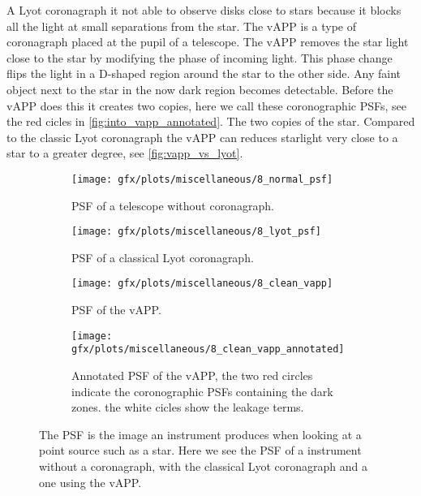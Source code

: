 A Lyot coronagraph it not able to observe disks close to stars because it blocks all the light at small separations from the star. The \ac{vAPP} \cite{vapp_snik} is a type of coronagraph placed at the pupil of a telescope. The \ac{vAPP} removes the star light close to the star by modifying the phase of incoming light. This phase change flips the light in a D-shaped region around the star to the other side. Any faint object next to the star in the now dark region becomes detectable. Before the \ac{vAPP} does this it creates two copies, here we call these coronographic \acp{PSF}, see the red cicles in \autoref{fig:into_vapp_annotated}. The two copies of the star. Compared to the classic Lyot coronagraph the \ac{vAPP} can reduces starlight very close to a star to a greater degree, see \autoref{fig:vapp_vs_lyot}.  

\begin{figure}[h!]
      \begin{subfigure}[t]{0.5\textwidth}
        \texttt{[image: gfx/plots/miscellaneous/8\_normal\_psf]}
        \caption{\ac{PSF} of a telescope without coronagraph.}
        \label{fig:classic_psf}
      \end{subfigure}
      \begin{subfigure}[t]{0.5 \textwidth}
        \texttt{[image: gfx/plots/miscellaneous/8\_lyot\_psf]}
        \caption{\ac{PSF} of a classical Lyot coronagraph.}
        \label{fig:lyot}
      \end{subfigure}%
      
      \begin{subfigure}[t]{0.5\textwidth}
        \texttt{[image: gfx/plots/miscellaneous/8\_clean\_vapp]}
        \caption{\ac{PSF} of the \ac{vAPP}.}
        \label{fig:into_vapp}
      \end{subfigure}
      \begin{subfigure}[t]{0.5\textwidth}
        \texttt{[image: gfx/plots/miscellaneous/8\_clean\_vapp\_annotated]}
        \caption{Annotated \ac{PSF} of the \ac{vAPP}, the two red circles indicate the coronographic \acp{PSF} containing the dark zones. the white cicles show the leakage terms.}
        \label{fig:into_vapp_annotated}
      \end{subfigure}      
  \caption{The \ac{PSF} is the image an instrument produces when looking at a point source such as a star. Here we see the \ac{PSF} of a instrument without a coronagraph, with the classical Lyot coronagraph and a one using the \ac{vAPP}.}
  \label{fig:vapp_vs_lyot}
\end{figure}

